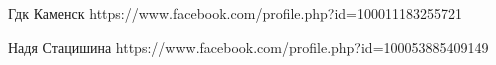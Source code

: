 






Гдк Каменск
https://www.facebook.com/profile.php?id=100011183255721

Надя Стацишина
https://www.facebook.com/profile.php?id=100053885409149













